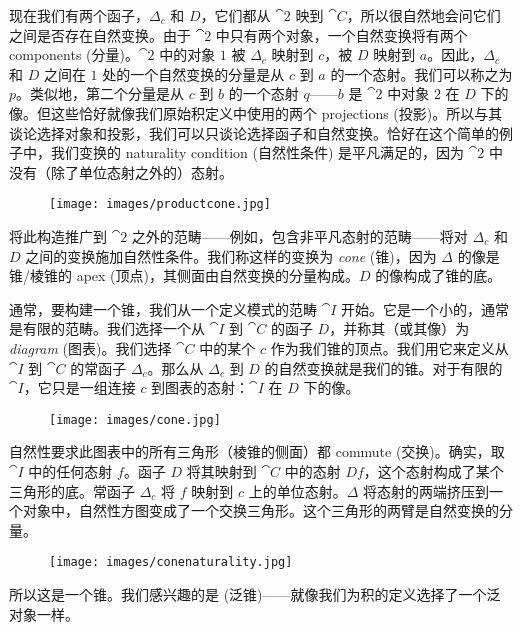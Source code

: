 \noindent
现在我们有两个函子，$\Delta_c$ 和 $D$，它们都从 $\cat{2}$ 映到 $\cat{C}$，所以很自然地会问它们之间是否存在自然变换。由于 $\cat{2}$ 中只有两个对象，一个自然变换将有两个 components (分量)。$\cat{2}$ 中的对象 $1$ 被 $\Delta_c$ 映射到 $c$，被 $D$ 映射到 $a$。因此，$\Delta_c$ 和 $D$ 之间在 $1$ 处的一个自然变换的分量是从 $c$ 到 $a$ 的一个态射。我们可以称之为 $p$。类似地，第二个分量是从 $c$ 到 $b$ 的一个态射 $q$——$b$ 是 $\cat{2}$ 中对象 $2$ 在 $D$ 下的像。但这些恰好就像我们原始积定义中使用的两个 projections (投影)。所以与其谈论选择对象和投影，我们可以只谈论选择函子和自然变换。恰好在这个简单的例子中，我们变换的 naturality condition (自然性条件) 是平凡满足的，因为 $\cat{2}$ 中没有（除了单位态射之外的）态射。

\begin{figure}[H]
  \centering
  \texttt{[image: images/productcone.jpg]}
\end{figure}

\noindent
将此构造推广到 $\cat{2}$ 之外的范畴——例如，包含非平凡态射的范畴——将对 $\Delta_c$ 和 $D$ 之间的变换施加自然性条件。我们称这样的变换为 \emph{cone} (锥)，因为 $\Delta$ 的像是锥/棱锥的 apex (顶点)，其侧面由自然变换的分量构成。$D$ 的像构成了锥的底。

通常，要构建一个锥，我们从一个定义模式的范畴 $\cat{I}$ 开始。它是一个小的，通常是有限的范畴。我们选择一个从 $\cat{I}$ 到 $\cat{C}$ 的函子 $D$，并称其（或其像）为 \emph{diagram} (图表)。我们选择 $\cat{C}$ 中的某个 $c$ 作为我们锥的顶点。我们用它来定义从 $\cat{I}$ 到 $\cat{C}$ 的常函子 $\Delta_c$。那么从 $\Delta_c$ 到 $D$ 的自然变换就是我们的锥。对于有限的 $\cat{I}$，它只是一组连接 $c$ 到图表的态射：$\cat{I}$ 在 $D$ 下的像。

\begin{figure}[H]
  \centering
  \texttt{[image: images/cone.jpg]}
\end{figure}

\noindent
自然性要求此图表中的所有三角形（棱锥的侧面）都 commute (交换)。确实，取 $\cat{I}$ 中的任何态射 $f$。函子 $D$ 将其映射到 $\cat{C}$ 中的态射 $D f$，这个态射构成了某个三角形的底。常函子 $\Delta_c$ 将 $f$ 映射到 $c$ 上的单位态射。$\Delta$ 将态射的两端挤压到一个对象中，自然性方图变成了一个交换三角形。这个三角形的两臂是自然变换的分量。

\begin{figure}[H]
  \centering
  \texttt{[image: images/conenaturality.jpg]}
\end{figure}

\noindent
所以这是一个锥。我们感兴趣的是  (泛锥)——就像我们为积的定义选择了一个泛对象一样。

